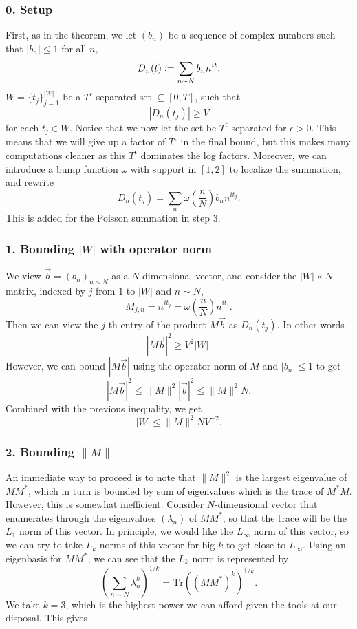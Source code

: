 \subsubsection*{0. Setup}
First, as in the theorem, we let $(b_n)$ be a sequence of complex numbers such that $|b_n|\leq 1$ for all $n$, \[
D_n(t)\mathrel{\mathop:}= \sum_{n\sim N}b_n n^{it},
\] $W=\{t_j\}_{j=1}^{|W|}$ be a $T^\epsilon$-separated set $\subseteq [0,T]$, such that \[
\left|D_n(t_j)\right|\geq V
\]
for each $t_j\in W$. Notice that we now let the set be $T^\epsilon$ separated for $\epsilon>0$. This means that we will give up a factor of $T^\epsilon$ in the final bound, but this makes many computations cleaner as this $T^\epsilon$ dominates the log factors. Moreover, we can introduce a bump function $\omega$ with support in $[1,2]$ to localize the summation, and rewrite \[
    D_n(t_j)=\sum_{n}\omega\left(\frac{n}{N}\right)b_n n^{it_j}.
\]
This is added for the Poisson summation in step $3$.
\subsubsection*{1. Bounding $|W|$ with operator norm}
We view $\vec{b}=(b_n)_{n\sim N}$ as a $N$-dimensional vector, and consider the $|W|\times N$ matrix, indexed by $j$ from $1$ to $|W|$ and $n\sim N$,\[
    M_{j,n}=n^{it_j}= \omega\left(\frac{n}{N}\right)n^{i t_j}.
\]
Then we can view the $j$-th entry of the product $M\vec{b}$ as $D_n(t_j)$. In other words \[
|M\vec{b}|^2\geq V^2{|W|}.
\]
However, we can bound $|M\vec{b}|$ using the operator norm of $M$ and $|b_n|\leq 1$ to get\[
    |M\vec{b}|^2\leq \|M\|^2|\vec{b}|^2 \leq \|M\|^2 N.
\]
Combined with the previous inequality, we get \begin{equation}
    \label{basicineq}
|W|\leq \|M\|^2 NV^{-2}.
\end{equation}

\subsubsection*{2. Bounding $\|M\|$}
An immediate way to proceed is to note that $\|M\|^2$ is the largest eigenvalue of $MM^*$, which in turn is bounded by sum of eigenvalues which is the trace of $M^*M$. However, this is somewhat inefficient. Consider $N$-dimensional vector that enumerates through the eigenvalues $(\lambda_n)$ of $MM^*$, so that the trace will be the $L_1$ norm of this vector. In principle, we would like the $L_{\infty}$ norm of this vector, so we can try to take $L_k$ norms of this vector for big $k$ to get close to $L_\infty$. Using an eigenbasis for $MM^*$, we can see that the $L_k$ norm is represented by \[
\left(\sum_{n\sim N}\lambda_n ^ {k}\right)^{1/k}= \textrm{Tr}((MM^*)^k)^{1/k}.
\]
We take $k=3$, which is the highest power we can afford given the tools at our disposal. This gives


